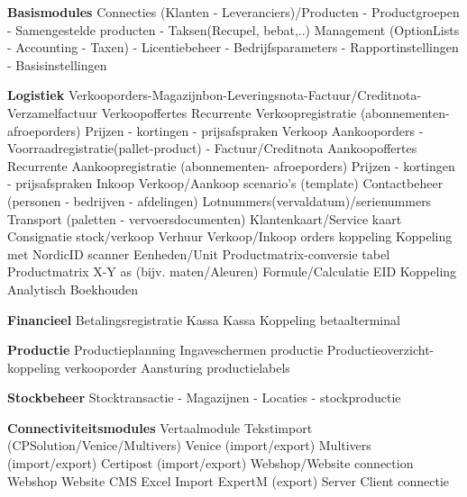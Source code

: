 \textbf{Basismodules}
Connecties (Klanten - Leveranciers)/Producten - Productgroepen - Samengestelde producten - Taksen(Recupel, bebat,..)
Management (OptionLists - Accounting - Taxen) - Licentiebeheer - Bedrijfsparameters - Rapportinstellingen - Basisinstellingen

\textbf{Logistiek}
Verkooporders-Magazijnbon-Leveringsnota-Factuur/Creditnota-Verzamelfactuur
Verkoopoffertes
Recurrente Verkoopregistratie (abonnementen-afroeporders)
Prijzen - kortingen - prijsafspraken Verkoop
Aankooporders - Voorraadregistratie(pallet-product) - Factuur/Creditnota
Aankoopoffertes
Recurrente Aankoopregistratie (abonnementen- afroeporders)
Prijzen - kortingen - prijsafspraken Inkoop
Verkoop/Aankoop scenario's (template)
Contactbeheer (personen - bedrijven - afdelingen)
Lotnummers(vervaldatum)/serienummers
Transport (paletten - vervoersdocumenten)
Klantenkaart/Service kaart
Consignatie stock/verkoop
Verhuur
Verkoop/Inkoop orders koppeling
Koppeling met NordicID scanner
Eenheden/Unit Productmatrix-conversie tabel
Productmatrix X-Y as (bijv. maten/Aleuren)
Formule/Calculatie
EID Koppeling
Analytisch Boekhouden

\textbf{Financieel}
Betalingsregistratie
Kassa
Kassa Koppeling betaalterminal

\textbf{Productie}
Productieplanning
Ingaveschermen productie
Productieoverzicht-koppeling verkooporder
Aansturing productielabels

\textbf{Stockbeheer}
Stocktransactie - Magazijnen - Locaties - stockproductie

\textbf{Connectiviteitsmodules}
Vertaalmodule
Tekstimport (CPSolution/Venice/Multivers)
Venice (import/export)
Multivers (import/export)
Certipost (import/export)
Webshop/Website connection
Webshop
Website CMS
Excel Import
ExpertM (export)
Server Client connectie
